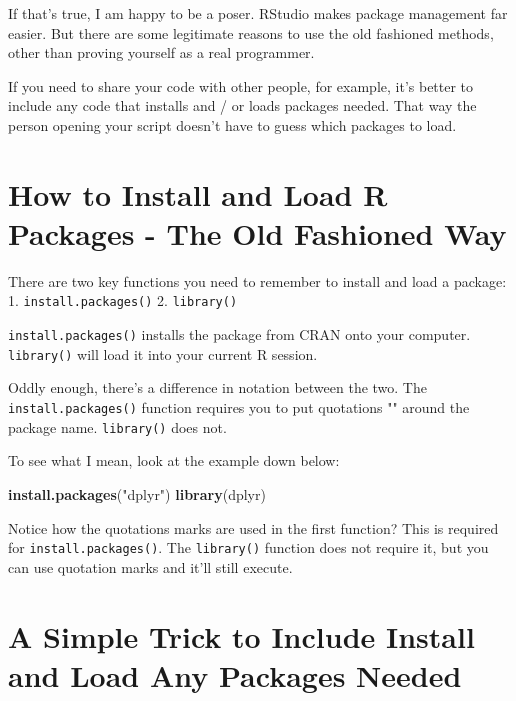 \documentclass[
]{book}
\newenvironment{Shaded}{\begin{snugshade}}{\end{snugshade}}
\newcommand{\KeywordTok}[1]{\textcolor[rgb]{0.13,0.29,0.53}{\textbf{#1}}}
\newcommand{\NormalTok}[1]{#1}
\newcommand{\StringTok}[1]{\textcolor[rgb]{0.31,0.60,0.02}{#1}}
\begin{document}
\begin{center}
If that's true, I am happy to be a poser. RStudio makes package management far easier. But there are some legitimate reasons to use the old fashioned methods, other than proving yourself as a real programmer.

If you need to share your code with other people, for example, it's better to include any code that installs and / or loads packages needed. That way the person opening your script doesn't have to guess which packages to load.

\hypertarget{how-to-install-and-load-r-packages---the-old-fashioned-way}{%
\section{How to Install and Load R Packages - The Old Fashioned Way}\label{how-to-install-and-load-r-packages---the-old-fashioned-way}}

There are two key functions you need to remember to install and load a package:
1. \texttt{install.packages()}
2. \texttt{library()}

\texttt{install.packages()} installs the package from CRAN onto your computer. \texttt{library()} will load it into your current R session.

Oddly enough, there's a difference in notation between the two. The \texttt{install.packages()} function requires you to put quotations "" around the package name. \texttt{library()} does not.

To see what I mean, look at the example down below:

\begin{Shaded}
\begin{Highlighting}[]
  \KeywordTok{install.packages}\NormalTok{(}\StringTok{"dplyr"}\NormalTok{)}
  \KeywordTok{library}\NormalTok{(dplyr)}
\end{Highlighting}
\end{Shaded}

Notice how the quotations marks are used in the first function? This is required for \texttt{install.packages()}. The \texttt{library()} function does not require it, but you can use quotation marks and it'll still execute.

\hypertarget{a-simple-trick-to-include-install-and-load-any-packages-needed}{%
\section{A Simple Trick to Include Install and Load Any Packages Needed}\label{a-simple-trick-to-include-install-and-load-any-packages-needed}}


\end{center}
\end{document}
